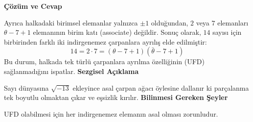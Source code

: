 \documentclass[11pt, a4paper]{article}
\newenvironment{cozum}{
    \vspace{0.5cm}
    \noindent\textcolor{green!60!black}{\faCheckCircle\enspace \textbf{\Large Çözüm ve Cevap}}\par\vspace{0.2cm}
}{}
\newenvironment{sezgisel}{
    \vspace{0.5cm}
    \noindent\textcolor{orange!80!black}{\faLightbulb\enspace \textbf{\Large Sezgisel Açıklama}}\par\vspace{0.2cm}
    \itshape
}{}
\newenvironment{bilgi}{
    \vspace{0.5cm}
    \noindent\textcolor{red!70!black}{\faExclamationTriangle\enspace \textbf{\Large Bilinmesi Gereken Şeyler}}\par\vspace{0.2cm}
}{}
\begin{document}
\begin{cozum}
Ayrıca halkadaki birimsel elemanlar yalnızca $\pm 1$ olduğundan, $2$ veya $7$ elemanları $\theta - 7 + 1$ elemanının birim katı (associate) değildir. Sonuç olarak, $14$ sayısı için birbirinden farklı iki indirgenemez çarpanlara ayrılış elde edilmiştir:
\[ 14 = 2 \cdot 7 = (\theta - 7 + 1)(\bar{\theta} - 7 + 1) \]
Bu durum, halkada tek türlü çarpanlara ayrılma özelliğinin (UFD) sağlanmadığını ispatlar.
\end{cozum}
\begin{sezgisel}
Sayı dünyasına $\sqrt{-13}$ ekleyince asal çarpan ağacı öylesine dallanır ki parçalanma tek boyutlu olmaktan çıkar ve eşsizlik kırılır.
\end{sezgisel}
\begin{bilgi}
UFD olabilmesi için her indirgenemez elemanın asal olması zorunludur.
\end{bilgi}

\newpage
\end{document}
